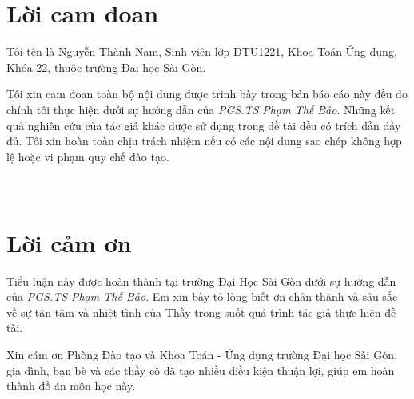 \documentclass[12pt,a4paper]{report}
\numberwithin{equation}{section}
\theoremstyle{definition} %
\begin{document}
	\chapter*{Lời cam đoan}
	\thispagestyle{fancy}
	\vspace{1cm}
	\indent
	
	Tôi tên là Nguyễn Thành Nam, Sinh viên lớp DTU1221, Khoa Toán-Ứng dụng, Khóa 22,  thuộc trường Đại học Sài Gòn.
	
	 Tôi xin cam đoan toàn bộ nội dung được trình bày trong bản báo cáo này  đều do chính tôi thực hiện dưới sự hướng dẫn của \textit{PGS.TS Phạm Thế Bảo}. Những kết quả nghiên cứu của tác giả khác được sử dụng trong đề tài  đều có trích dẫn đầy đủ. Tôi xin hoàn toàn chịu trách nhiệm nếu có các nội dung sao chép không hợp lệ hoặc vi phạm quy chế đào tạo. 
	\\
	\\
	\\

	
	
	\chapter*{Lời cảm ơn}
	\thispagestyle{fancy}
	\vspace{1cm}
	\indent
	
Tiểu luận này được hoàn thành tại trường Đại Học Sài Gòn dưới sự hướng dẫn của \textit{PGS.TS Phạm Thế Bảo}. Em xin bày tỏ lòng biết ơn chân thành và sâu sắc về sự tận tâm và nhiệt tình của Thầy trong suốt quá trình tác giả thực hiện đề tài.
	
	
	\bigskip
	Xin cám ơn Phòng Đào tạo  và Khoa Toán - Ứng dụng trường Đại học Sài Gòn, gia đình, bạn bè  và các thầy cô đã tạo nhiều điều kiện thuận lợi, giúp em hoàn thành đồ án môn học này.
	\\
	\\
	\\
\end{document}
